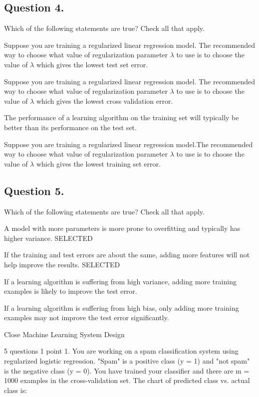 \documentclass[11pt]{article} %
\begin{document}
\subsection*{Question 4. }
Which of the following statements are true? Check all that apply.

Suppose you are training a regularized linear regression model. The recommended way to choose what value of regularization parameter $\lambda$ to use is to choose the value of $\lambda$ which gives the lowest test set error.

Suppose you are training a regularized linear regression model. The recommended way to choose what value of regularization parameter $\lambda$ to use is to choose the value of $\lambda$ which gives the lowest cross validation error.

The performance of a learning algorithm on the training set will typically be better than its performance on the test set.

Suppose you are training a regularized linear regression model.The recommended way to choose what value of regularization parameter $\lambda$ to use is to choose the value of $\lambda$ which gives the lowest training set error.

\subsection*{Question 5. }
Which of the following statements are true? Check all that apply.

A model with more parameters is more prone to overfitting and typically has higher variance. SELECTED

If the training and test errors are about the same, adding more features will not help improve the results. SELECTED

If a learning algorithm is suffering from high variance, adding more training examples is likely to improve the test error.

If a learning algorithm is suffering from high bias, only adding more training examples may not improve the test error significantly.

Close
Machine Learning System Design

5 questions
1
point
1. 
You are working on a spam classification system using regularized logistic regression. "Spam" is a positive class (y = 1) and "not spam" is the negative class (y = 0). You have trained your classifier and there are m = 1000 examples in the cross-validation set. The chart of predicted class vs. actual class is:
\end{document}
